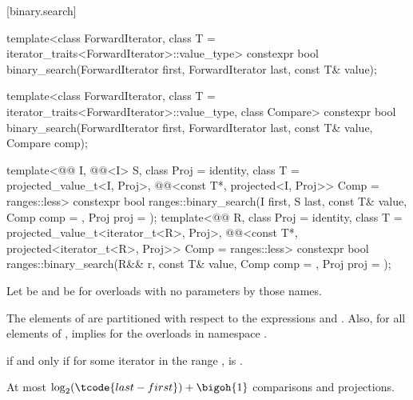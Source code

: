 [binary.search]{}

%
\begin{itemdecl}
template<class ForwardIterator, class T = iterator_traits<ForwardIterator>::value_type>
  constexpr bool
    binary_search(ForwardIterator first, ForwardIterator last,
                  const T& value);

template<class ForwardIterator, class T = iterator_traits<ForwardIterator>::value_type,
         class Compare>
  constexpr bool
    binary_search(ForwardIterator first, ForwardIterator last,
                  const T& value, Compare comp);

template<@@ I, @@<I> S, class Proj = identity,
         class T = projected_value_t<I, Proj>,
         @@<const T*, projected<I, Proj>> Comp = ranges::less>
  constexpr bool ranges::binary_search(I first, S last, const T& value, Comp comp = {},
                                       Proj proj = {});
template<@@ R, class Proj = identity,
         class T = projected_value_t<iterator_t<R>, Proj>,
         @@<const T*, projected<iterator_t<R>, Proj>> Comp =
           ranges::less>
  constexpr bool ranges::binary_search(R&& r, const T& value, Comp comp = {},
                                       Proj proj = {});
\end{itemdecl}

\begin{itemdescr}
\pnum
Let  be  and
 be 
for overloads with no parameters by those names.

\pnum
\expects
The elements  of 
are partitioned with respect to the expressions
 and
.
Also, for all elements  of ,
 implies 
for the overloads in namespace .

\pnum
\returns
{} if and only if
for some iterator  in the range ,
is .

\pnum
\complexity
At most $\log_2(\tcode{last - first}) + \bigoh{1}$ comparisons and projections.
\end{itemdescr}

